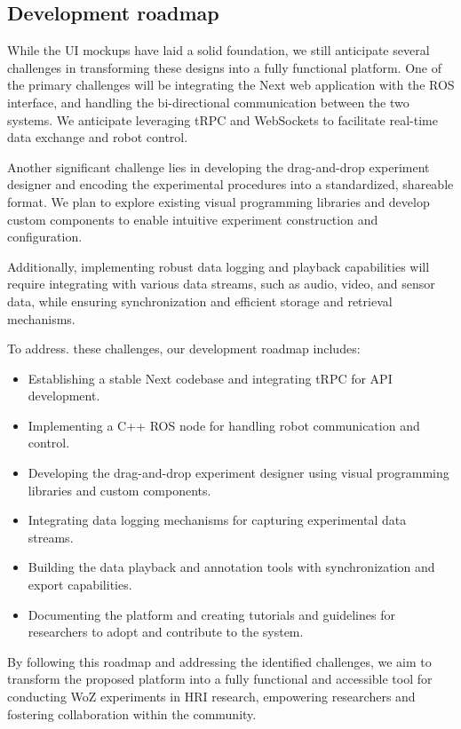 \documentclass[letterpaper, 10 pt, conference]{ieeeconf}
\begin{document}
\subsection{Development roadmap}

While the UI mockups have laid a solid foundation, we still anticipate several challenges in transforming these designs into a fully functional platform. One of the primary challenges will be integrating the Next web application with the ROS interface, and handling the bi-directional communication between the two systems. We anticipate leveraging tRPC and WebSockets to facilitate real-time data exchange and robot control.

Another significant challenge lies in developing the drag-and-drop experiment designer and encoding the experimental procedures into a standardized, shareable format. We plan to explore existing visual programming libraries and develop custom components to enable intuitive experiment construction and configuration.

Additionally, implementing robust data logging and playback capabilities will require integrating with various data streams, such as audio, video, and sensor data, while ensuring synchronization and efficient storage and retrieval mechanisms.


To address. these challenges, our development roadmap includes:
\begin{itemize}
    \item Establishing a stable Next codebase and integrating tRPC for API development.
    \item Implementing a C++ ROS node for handling robot communication and control.
    \item Developing the drag-and-drop experiment designer using visual programming libraries and custom components.
    \item Integrating data logging mechanisms for capturing experimental data streams.
    \item Building the data playback and annotation tools with synchronization and export capabilities.
    \item Documenting the platform and creating tutorials and guidelines for researchers to adopt and contribute to the system.
\end{itemize}

By following this roadmap and addressing the identified challenges, we aim to transform the proposed platform into a fully functional and accessible tool for conducting WoZ experiments in HRI research, empowering researchers and fostering collaboration within the community.
\end{document}
